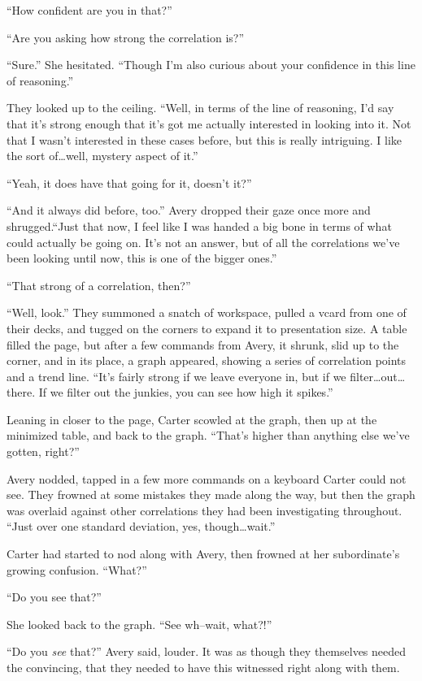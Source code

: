 ``How confident are you in that?''

``Are you asking how strong the correlation is?''

``Sure.'' She hesitated. ``Though I'm also curious about your confidence in this line of reasoning.''

They looked up to the ceiling. ``Well, in terms of the line of reasoning, I'd say that it's strong enough that it's got me actually interested in looking into it. Not that I wasn't interested in these cases before, but this is really intriguing. I like the sort of\ldots{}well, mystery aspect of it.''

``Yeah, it does have that going for it, doesn't it?''

``And it always did before, too.'' Avery dropped their gaze once more and shrugged.``Just that now, I feel like I was handed a big bone in terms of what could actually be going on. It's not an answer, but of all the correlations we've been looking until now, this is one of the bigger ones.''

``That strong of a correlation, then?''

``Well, look.'' They summoned a snatch of workspace, pulled a vcard from one of their decks, and tugged on the corners to expand it to presentation size. A table filled the page, but after a few commands from Avery, it shrunk, slid up to the corner, and in its place, a graph appeared, showing a series of correlation points and a trend line. ``It's fairly strong if we leave everyone in, but if we filter\ldots{}out\ldots{}there. If we filter out the junkies, you can see how high it spikes.''

Leaning in closer to the page, Carter scowled at the graph, then up at the minimized table, and back to the graph. ``That's higher than anything else we've gotten, right?''

Avery nodded, tapped in a few more commands on a keyboard Carter could not see. They frowned at some mistakes they made along the way, but then the graph was overlaid against other correlations they had been investigating throughout. ``Just over one standard deviation, yes, though\ldots{}wait.''

Carter had started to nod along with Avery, then frowned at her subordinate's growing confusion. ``What?''

``Do you see that?''

She looked back to the graph. ``See wh--wait, what?!''

``Do you \emph{see} that?'' Avery said, louder. It was as though they themselves needed the convincing, that they needed to have this witnessed right along with them.

